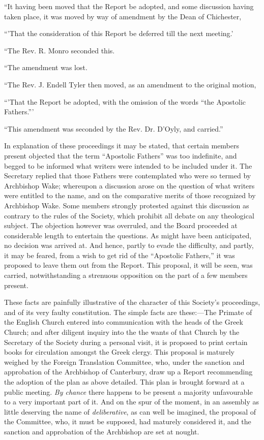 ``It having been moved that the Report be adopted,
and some discussion having taken place, it was moved by way of amendment
by the Dean of Chichester,

``'That the consideration of this Report be deferred
till the next meeting.'

``The Rev. R. Monro seconded this.

``The amendment was lost.

``The Rev. J. Endell Tyler then moved, as an
amendment to the original motion,

``'That the Report be adopted, with the omission of
the words ``the Apostolic Fathers.'''

``This amendment was seconded by the Rev. Dr. D'Oyly,
and carried.''

In explanation of these proceedings it may be
stated, that certain members present objected that the term ``Apostolic
Fathers'' was too indefinite, and begged to be informed what writers were
intended to be included under it. The Secretary replied that those
Fathers were contemplated who were so termed by Archbishop Wake;
whereupon a discussion arose on the question of what writers were
entitled to the name, and on the comparative merits of those recognized
by Archbishop Wake. Some members strongly protested against this
discussion as contrary to the rules of the Society, which prohibit all
debate on any theological subject. The objection however was overruled,
and the Board proceeded at considerable length to entertain the
questions. As might have been anticipated, no decision was arrived at.
And hence, partly to evade the difficulty, and partly, it may be feared,
from a wish to get rid of the ``Apostolic Fathers,'' it was proposed to
leave them out from the Report. This proposal, it will be seen,
was carried, notwithstanding a strenuous opposition on the part of a few
members present.

These facts are painfully illustrative of the
character of this Society's proceedings, and of its very faulty
constitution. The simple facts are these:—The Primate of the English
Church entered into communication with the heads of the Greek Church;
and after diligent inquiry into the the wants of that Church by the
Secretary of the Society during a personal visit, it is proposed to
print certain books for circulation amongst the Greek clergy. This
proposal is maturely weighed by the Foreign Translation Committee, who,
under the sanction and approbation of the Archbishop of Canterbury, draw
up a Report recommending the adoption of the plan as above detailed.
This plan is brought forward at a public meeting. \emph{By chance} there
happens to be present a majority unfavourable to a very important part
of it. And on the spur of the moment, in an assembly as little deserving
the name of \emph{deliberative}, as can well be imagined, the proposal
of the Committee, who, it must be supposed, had maturely considered it,
and the sanction and approbation of the Archbishop are set at nought.

